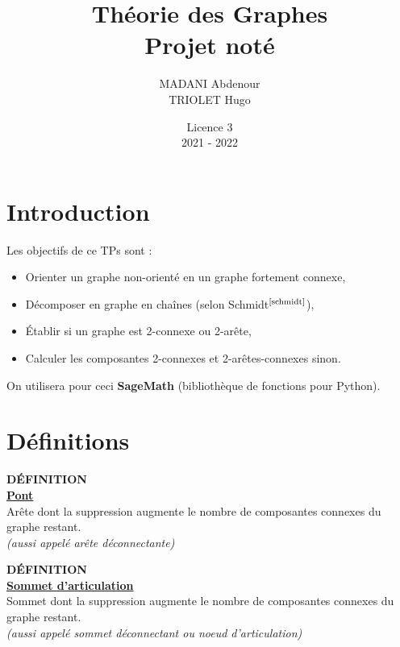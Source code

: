 \documentclass{article}      %
\title{Théorie des Graphes\\\Large{Projet noté}}
\author{MADANI Abdenour\\TRIOLET Hugo}
\date{Licence 3\\2021 - 2022}
\begin{document}
\normalsize
\maketitle

\renewcommand*\contentsname{Table des matières}
\tableofcontents
\newpage

\section{Introduction}
Les objectifs de ce TPs sont :
\begin{itemize}
  \item Orienter un graphe non-orienté en un graphe fortement connexe,
  \item Décomposer en graphe en chaînes (selon Schmidt$^\text{\cite{schmidt}}$),
  \item Établir si un graphe est 2-connexe ou 2-arête,
  \item Calculer les composantes 2-connexes et 2-arêtes-connexes sinon.
\end{itemize}

On utilisera pour ceci \textbf{SageMath} (bibliothèque de fonctions pour Python).

\section{Définitions}





\begin{definition}
{ \scriptsize \textcolor{definition}{ \textbf{DÉFINITION}}}
\vspace{3px}
\\ \underline{\textbf{Pont}}
\vspace{2.5px}
\\ Arête dont la suppression augmente le nombre de composantes connexes du graphe restant.%
\\ \textit{(aussi appelé arête déconnectante)}
\end{definition}

\begin{definition}
{ \scriptsize \textcolor{definition}{ \textbf{DÉFINITION}}}
\vspace{3px}
\\ \underline{\textbf{Sommet d'articulation}}
\vspace{2.5px}
\\ Sommet dont la suppression augmente le nombre de composantes connexes du graphe restant.%
\\ \textit{(aussi appelé sommet déconnectant ou noeud d'articulation)}
\end{definition}
\end{document}

